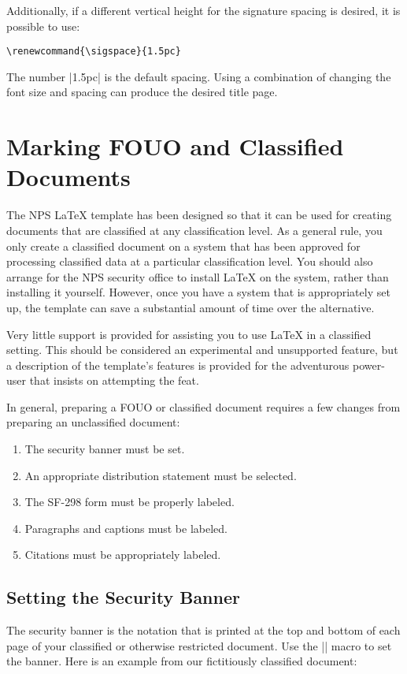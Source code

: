 Additionally, if a different vertical height for the signature spacing is 
desired, it is possible to use:

\begin{Verbatim}
\renewcommand{\sigspace}{1.5pc}
\end{Verbatim}

The number |1.5pc| is the default spacing.  Using a combination of changing the font size and spacing can produce the desired title page.

\section{Marking FOUO and Classified Documents}\label{sec:classified}
The NPS \LaTeX{} template has been designed so that it can be used
for creating documents that are 
classified at any classification level. As a general rule, you only
create a classified document on a system that has been approved for
processing classified data at a particular classification level. You
should also arrange for the NPS security office to install \LaTeX{} on
the system, rather than installing it yourself. However, once you have
a system that is appropriately set up, the template can save a
substantial amount of time over the alternative.

Very little support is provided for assisting you to use \LaTeX{} in
a classified setting. This should be considered an experimental
and unsupported feature, but a description of the template's features is
provided for the adventurous power-user that insists
on attempting the feat.

In general, preparing a FOUO or classified document requires a few
changes from preparing an unclassified document:
\begin{enumerate}
\item The security banner must be set.
\item An appropriate distribution statement must be selected.
\item The SF-298 form must be properly labeled.
\item Paragraphs and captions must be labeled.
\item Citations must be appropriately labeled.
\end{enumerate}


\subsection{Setting the Security Banner}
The security banner is the notation that is printed at the top and
bottom of each page of your classified or otherwise restricted
document. Use the |\securitybanner{}| macro to set the banner. Here is
an example from our fictitiously classified document:

